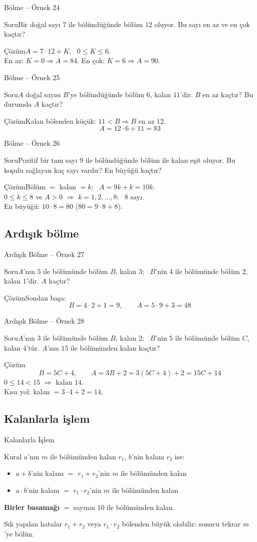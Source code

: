 \documentclass[aspectratio=169,11pt,handout]{beamer}
\newcommand{\soru}[3]{%
\begin{frame}{#1}
  \begin{block}{Soru}\large #2\end{block}
  \pause
  \begin{exampleblock}{Çözüm}\large #3\end{exampleblock}
\end{frame}}
\begin{document}
\soru{Bölme -- Örnek 24}
{Bir doğal sayı \(7\) ile bölündüğünde bölüm \(12\) oluyor. Bu sayı en az ve en çok kaçtır?}
{\(A=7\cdot 12+K\), \ \(0\le K\le 6\).\\[3pt]
En az: \(K=0\Rightarrow A=84\). \qquad En çok: \(K=6\Rightarrow A=90\).}

\soru{Bölme -- Örnek 25}
{\(A\) doğal sayısı \(B\)'ye bölündüğünde bölüm \(6\), kalan \(11\)'dir. \(B\) en az kaçtır? Bu durumda \(A\) kaçtır?}
{Kalan bölenden küçük: \(11<B\Rightarrow B\) en az \(12\).
\[A=12\cdot 6+11=83\]}

\soru{Bölme -- Örnek 26}
{Pozitif bir tam sayı \(9\) ile bölündüğünde bölüm ile kalan eşit oluyor. Bu koşulu sağlayan kaç sayı vardır? En büyüğü kaçtır?}
{Bölüm \(=\) kalan \(=k\): \ \(A=9k+k=10k\).\\[3pt]
\(0\le k\le 8\) ve \(A>0\) \(\Rightarrow\) \(k=1,2,\dots,8\): \ \(8\) sayı.\\[3pt]
En büyüğü: \(10\cdot 8=80\) \quad (\(80=9\cdot 8+8\)).}

\subsection{Ardışık bölme}
\soru{Ardışık Bölme -- Örnek 27}
{\(A\)'nın \(5\) ile bölümünde bölüm \(B\), kalan \(3\); \ \(B\)'nin \(4\) ile bölümünde bölüm \(2\), kalan \(1\)'dir. \(A\) kaçtır?}
{Sondan başa:
\[B=4\cdot 2+1=9,\qquad A=5\cdot 9+3=48\]}

\soru{Ardışık Bölme -- Örnek 28}
{\(A\)'nın \(3\) ile bölümünde bölüm \(B\), kalan \(2\); \ \(B\)'nin \(5\) ile bölümünde bölüm \(C\), kalan \(4\)'tür. \(A\)'nın \(15\) ile bölümünden kalan kaçtır?}
{\[B=5C+4,\qquad A=3B+2=3(5C+4)+2=15C+14\]
\(0\le 14<15\) \(\Rightarrow\) kalan \(14\).\\[3pt]
Kısa yol: kalan \(=3\cdot 4+2=14\).}

\subsection{Kalanlarla işlem}
\begin{frame}{Kalanlarla İşlem}
\begin{block}{Kural}
\(a\)'nın \(m\) ile bölümünden kalan \(r_1\), \(b\)'nin kalanı \(r_2\) ise:
\begin{itemize}
\item \(a+b\)'nin kalanı \(=\) \(r_1+r_2\)'nin \(m\) ile bölümünden kalan
\item \(a\cdot b\)'nin kalanı \(=\) \(r_1\cdot r_2\)'nin \(m\) ile bölümünden kalan
\end{itemize}
\textbf{Birler basamağı} \(=\) sayının \(10\) ile bölümünden kalan.
\end{block}
\begin{alertblock}{Sık yapılan hatalar}
\(r_1+r_2\) veya \(r_1\cdot r_2\) bölenden büyük olabilir: sonucu tekrar \(m\)'ye bölün.
\end{alertblock}
\end{frame}
\end{document}
